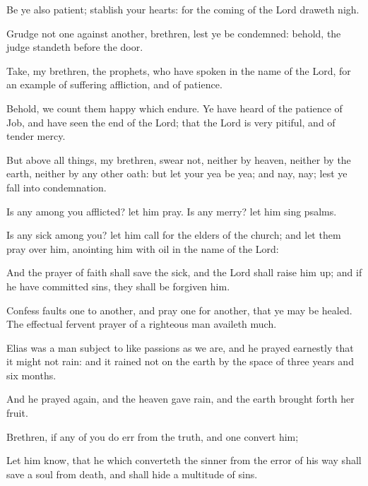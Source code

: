 {Be
ye
also
patient;
stablish
your
hearts:
for the
coming of the
Lord draweth
nigh.

Grudge
not one
against
another,
brethren,
lest ye be
condemned:
behold, the
judge
standeth
before the
door.

Take,
my
brethren, the
prophets,
who have
spoken in the
name of the
Lord, for an
example of suffering
affliction,
and of
patience.

Behold, we
count
them
happy which
endure. Ye have
heard of the
patience of
Job,
and have
seen the
end of the
Lord;
that the
Lord
is very
pitiful,
and of tender
mercy.

But
above all
things,
my
brethren,
swear
not,
neither by
heaven,
neither by the
earth,
neither by
any
other
oath:
but
let
your
yea
be
yea;
and
{}
nay,
nay;
lest ye
fall
into
condemnation.

Is
any
among
you
afflicted? let him
pray.
Is
any
merry? let him sing
psalms.

Is
any
sick
among
you? let him
call for the
elders of the
church;
and let them
pray
over
him,
anointing
him with
oil
in the
name of the
Lord:

And the
prayer of
faith shall
save the
sick,
and the
Lord shall
raise
him
up; and
if he have
committed
sins,
they shall
be
forgiven
him.

Confess
{}
faults one to
another,
and
pray
one
for
another,
that ye may be
healed. The effectual
fervent
prayer of a righteous
man
availeth
much.

Elias
was a
man subject to like
passions as we
are,
and he
prayed
earnestly that it
might
not
rain:
and it
rained
not
on the
earth by the space of
three
years
and
six
months.

And he
prayed
again,
and the
heaven
gave
rain,
and the
earth brought
forth
her
fruit.

Brethren,
if
any
of
you do
err
from the
truth,
and
one
convert
him;

Let him
know,
that he which
converteth the
sinner
from the
error of
his
way shall
save a
soul
from
death,
and shall
hide a
multitude of
sins.


\par }
